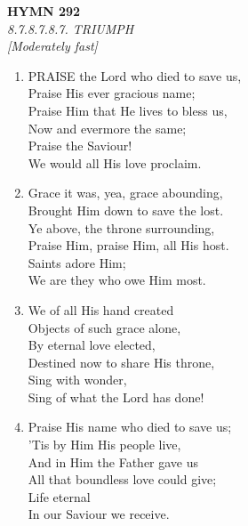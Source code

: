 \newpage
\begin{center}
    {\Large \textbf{HYMN 292}}
    \\
    \textit{8.7.8.7.8.7. TRIUMPH}
    \\
    \textit{\small [Moderately fast]}
\end{center}
\vspace{1em}

\begin{enumerate}
    \item PRAISE the Lord who died to save us, \\
        Praise His ever gracious name; \\
        Praise Him that He lives to bless us, \\
        Now and evermore the same; \\
        Praise the Saviour! \\
        We would all His love proclaim.

    \item Grace it was, yea, grace abounding, \\
        Brought Him down to save the lost. \\
        Ye above, the throne surrounding, \\
        Praise Him, praise Him, all His host. \\
        Saints adore Him; \\
        We are they who owe Him most.

    \item We of all His hand created \\
        Objects of such grace alone, \\
        By eternal love elected, \\
        Destined now to share His throne, \\
        Sing with wonder, \\
        Sing of what the Lord has done!

    \item Praise His name who died to save us; \\
        'Tis by Him His people live, \\
        And in Him the Father gave us \\
        All that boundless love could give; \\
        Life eternal \\
        In our Saviour we receive.

\end{enumerate}

